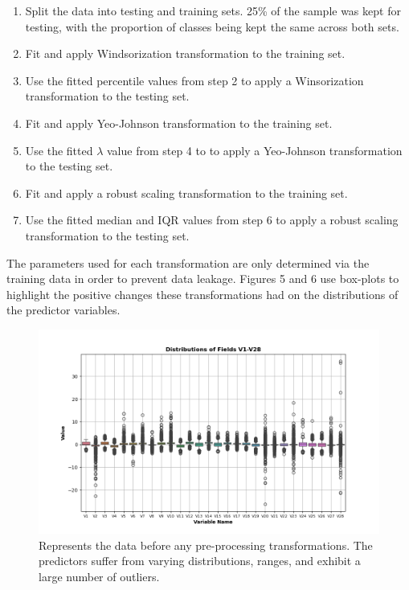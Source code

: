 \documentclass[11pt, oneside]{article}   	%
\begin{document}
\begin{enumerate}
	\item Split the data into testing and training sets. 25\% of the sample was kept for testing, with the proportion of classes being kept the same across both sets.
	\item Fit and apply Windsorization transformation to the training set.
	\item Use the fitted percentile values from step 2 to apply a Winsorization transformation to the testing set.
	\item Fit and apply Yeo-Johnson transformation to the training set.
	\item Use the fitted $\lambda$ value from step 4 to to apply a Yeo-Johnson transformation to the testing set.
	\item Fit and apply a robust scaling transformation to the training set.
	\item Use the fitted median and IQR values from step 6 to apply a robust scaling transformation to the testing set.
\end{enumerate}

The parameters used for each transformation are only determined via the training data in order to prevent data leakage. Figures 5 and 6 use box-plots to highlight the positive changes these transformations had on the distributions of the predictor variables. 

\begin{figure}[h!]
    \centering
    \includegraphics[width=1.0\textwidth]{figures/fig_5.png}
    \captionsetup{font=small} 
    \caption{Represents the data before any pre-processing transformations. The predictors suffer from varying distributions, ranges, and exhibit a large number of outliers.}
    \label{fig5}
\end{figure}
\end{document}
